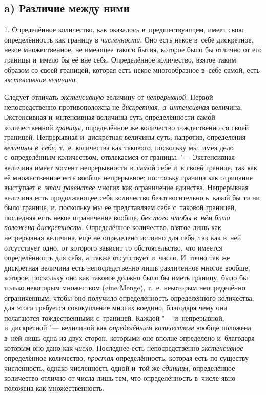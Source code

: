 
\subsection[a) Различие между ними]{a) Различие между ними}

1. Определённое количество, как оказалось в~предшествующем, имеет свою
определённость как границу в {\em численности}. Оно есть некое в~себе дискретное,
некое множественное, не имеющее такого бытия, которое было бы отлично от его
границы и~имело бы её вне себя. Определённое количество, взятое таким образом
со своей границей, которая есть некое многообразное в~себе самой, есть
{\em экстенсивная величина}.

Следует отличать {\em экстенсивную} величину от {\em непрерывной}. Первой
непосредственно противоположна не {\em дискретная, а~интенсивная}
величина. Экстенсивная и~интенсивная величины суть определённости сам\'{о}й
количественной {\em границы,} определённое же количество тождественно со своей
границей. Непрерывная и~дискретная величины суть, напротив, определения
{\em величины в~себе,} т.~е. количества как такового, поскольку мы, имея дело
с~определённым количеством, отвлекаемся от границы. "--- Экстенсивная величина
имеет момент непрерывности в~самой себе и~в своей границе, так как её
множественное есть вообще непрерывное; постольку граница как отрицание
выступает {\em в~этом равенстве} многих как ограничение единства. Непрерывная
величина есть продолжающее себя количество безотносительно к~какой бы то ни
было границе, и, поскольку мы её представляем себе с~таковой границей,
последняя есть некое ограничение вообще, {\em без того чтобы в~нём была
положена дискретность}. Определённое количество, взятое лишь как непрерывная
величина, ещё не определено истинно для себя, так как в~ней отсутствует одно,
от которого зависит то обстоятельство, что имеется определённость для себя,
а~также отсутствует и~число. И~точно так же дискретная величина есть
непосредственно лишь различенное многое вообще, которое, поскольку оно как
таковое должно было бы иметь границу, было бы только некоторым множеством (eine
Men\-ge), т.~е. некоторым неопределённо ограниченным; чтобы оно получило
определённость определённого количества, для этого требуется совокупление
многих воедино, благодаря чему они полагаются тождественными с~границей.
Каждой "--- и~непрерывной, и~дискретной "--- величиной как
{\em определённым количеством} вообще положена в~ней лишь одна из двух сторон,
которыми оно вполне определено и~благодаря которым оно дано
как {\em число}. Последнее
есть непосредственно {\em экстенсивное} определённое количество, {\em простая}
определённость, которая есть по существу численность, однако численность одной
и~той же {\em единицы;} определённое количество отлично от числа лишь тем, что определённость
в~числе явно положена как множественность.

